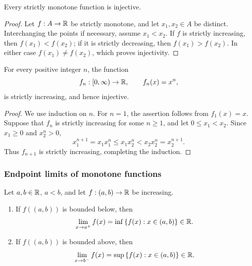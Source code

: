 \documentclass[11pt,a4paper]{amsart}
\begin{document}
\begin{theorem}
  Every strictly monotone function is injective.
\end{theorem}

\begin{proof}
  Let \(f:A\to\mathbb{R}\) be strictly monotone, and let \(x_1,x_2\in A\)
  be distinct. Interchanging the points if necessary, assume
  \(x_1<x_2\). If \(f\) is strictly increasing, then
  \(f(x_1)<f(x_2)\); if it is strictly decreasing, then
  \(f(x_1)>f(x_2)\). In either case \(f(x_1)\neq f(x_2)\),
  which proves injectivity.
\end{proof}

\begin{example}
  For every positive integer \(n\), the function
  \[
    f_n:[0,\infty)\to\mathbb{R},\qquad f_n(x)=x^n,
  \]
  is strictly increasing, and hence injective.
\end{example}

\begin{proof}
  We use induction on \(n\). For \(n=1\), the assertion follows
  from \(f_1(x)=x\). Suppose that \(f_n\) is strictly increasing
  for some \(n\geq1\), and let \(0\leq x_1<x_2\). Since
  \(x_1\geq0\) and \(x_2^n>0\),
  \[
    x_1^{n+1}=x_1x_1^n
    \leq x_1x_2^n
    <x_2x_2^n=x_2^{n+1}.
  \]
  Thus \(f_{n+1}\) is strictly increasing, completing the induction.
\end{proof}

\subsubsection{Endpoint limits of monotone functions}

\begin{theorem}\label{thm:monotone-endpoint-limits}
  Let \(a,b\in\mathbb{R}\), \(a<b\), and let \(f:(a,b)\to\mathbb{R}\)
  be increasing.
  \begin{enumerate}[label=(\alph*)]
    \item If \(f((a,b))\) is bounded below, then
      \[
        \lim_{x\to a^+}f(x)=\inf\left\lbrace f(x):x\in(a,b)\right\rbrace\in\mathbb{R}.
      \]
    \item If \(f((a,b))\) is bounded above, then
      \[
        \lim_{x\to b^-}f(x)=\sup\left\lbrace f(x):x\in(a,b)\right\rbrace\in\mathbb{R}.
      \]
  \end{enumerate}
\end{theorem}
\end{document}
